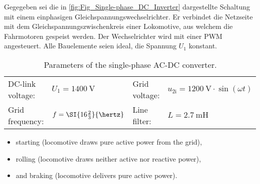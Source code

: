 \begin{germanblock}
Gegegeben sei die in \autoref{fig:Fig_Single-phase_DC_Inverter} dargestellte Schaltung mit einem einphasigen Gleichspannungswechselrichter.
Er verbindet die Netzseite mit dem Gleichspannungszwischenkreis
einer Lokomotive, aus welchem die Fahrmotoren gespeist werden. Der Wechselrichter wird mit einer PWM angesteuert. Alle Bauelemente seien ideal, die Spannung $U_\mathrm{1}$ konstant.
\end{germanblock}

\begin{table}[htb]
    \caption{Parameters of the single-phase AC-DC converter.}
    \centering
    \begin{tabular}{llll}
    \toprule
    DC-link voltage: & $U_{\mathrm{1}}=\SI{1400}{\volt}$ &
    Grid voltage: & $u_{\mathrm{2i}}=\SI{1200}{\volt} \cdot \sin(\omega t)$ \\
    Grid frequency: & $f=\SI{16\frac{2}{3}}{\hertz}$ &
    Line filter: &$L=\SI{2.7}{\milli\henry}$\\
    \bottomrule
    \end{tabular}
    \label{tab:para_ACDC-conv}
\end{table}
\begin{itemize}
    \item starting (locomotive draws pure active power from the grid),
    \item rolling (locomotive draws neither active nor reactive power),
    \item and braking (locomotive delivers pure active power).
\end{itemize} 
